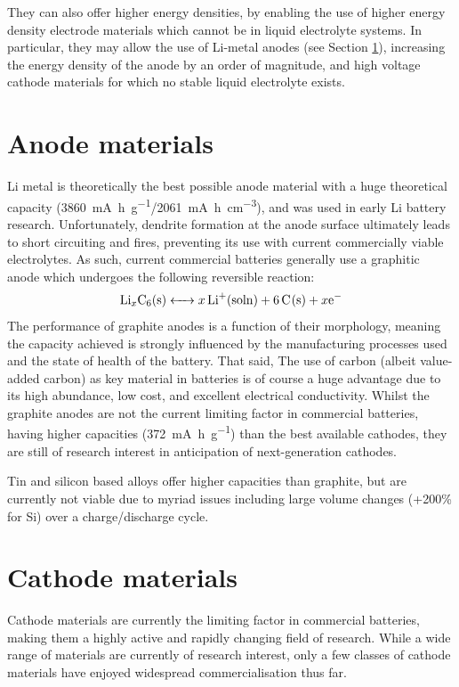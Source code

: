 They can also offer higher energy densities, by enabling the use of higher energy density electrode materials which cannot be in liquid electrolyte systems.
In particular, they may allow the use of Li-metal anodes (see Section \ref{sec:anodes}), increasing the energy density of the anode by an order of magnitude,\cite{Zhang2018} and high voltage cathode materials for which no stable liquid electrolyte exists.

\section{Anode materials}
\label{sec:anodes}
Li metal is theoretically the best possible anode material with a huge theoretical capacity (\SI{3860}{\milli\ampere\hour\per\gram}/\SI{2061}{\milli\ampere\hour\per\centi\meter\cubed}), and was used in early Li battery research. 
Unfortunately, dendrite formation at the anode surface ultimately leads to short circuiting and fires, preventing its use with current commercially viable electrolytes. \cite{Cheng2017,Guo2017a,Lin2017}
As such, current commercial batteries generally use a graphitic anode which undergoes the following reversible reaction:
\begin{equation}
\ce{Li_xC6(s) <-> $x$Li+(soln) +6C(s) + $x$e-}
\end{equation}
The performance of graphite anodes is a function of their morphology, meaning the capacity achieved is strongly influenced by the manufacturing processes used and the state of health of the battery.
That said, 
The use of carbon (albeit value-added carbon) as key material in batteries is of course a huge advantage due to its high abundance, low cost, and excellent electrical conductivity.
Whilst the graphite anodes are not the current limiting factor in commercial batteries, having higher capacities (\SI{372}{\milli\ampere\hour\per\gram}) than the best available cathodes, they are still of research interest in anticipation of next-generation cathodes.

Tin and silicon based alloys offer higher capacities than graphite, but are currently not viable due to myriad issues including large volume changes (+200\% for Si) over a charge/discharge cycle.\cite{Scrosati2011}

\newpage
\section{Cathode materials}
Cathode materials are currently the limiting factor in commercial batteries, making them a highly active and rapidly changing field of research.
While a wide range of materials are currently of research interest, only a few classes of cathode materials have enjoyed widespread commercialisation thus far.

